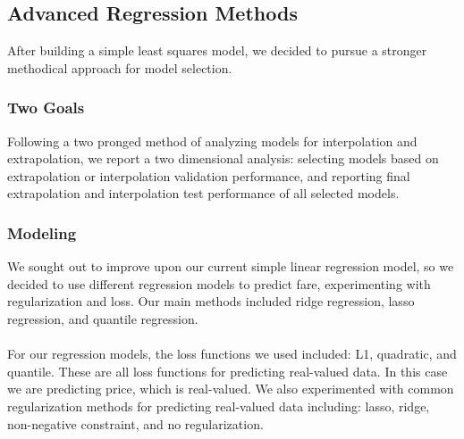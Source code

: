 \documentclass{article}
\begin{document}
\subsection{Advanced Regression Methods}
After building a simple least squares model, we decided to pursue a stronger methodical approach for model selection. 
\subsubsection{Two Goals}
Following a two pronged method of analyzing models for interpolation and extrapolation, we report a two dimensional analysis: selecting models based on extrapolation or interpolation validation performance, and reporting final extrapolation and interpolation test performance of all selected models.
\subsubsection{Modeling}
We sought out to improve upon our current simple linear regression model, so we decided to use different regression models to predict fare, experimenting with regularization and loss. Our main methods included ridge regression, lasso regression, and quantile regression.\\\\
For our regression models, the loss functions we used included: L1, quadratic, and quantile. These are all loss functions for predicting real-valued data. In this case we are predicting price, which is real-valued. We also experimented with common regularization methods for predicting real-valued data including: lasso, ridge, non-negative constraint, and no regularization. 
\end{document}
